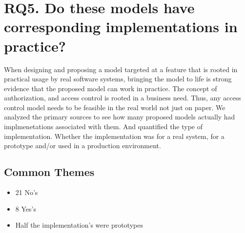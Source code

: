 \documentclass[letterpaper,10pt,english]{sphinxmanual}
\begin{document}
\chapter{RQ5. Do these models have corresponding implementations in practice?}
\label{research_questions/RQ_5::doc}\label{research_questions/RQ_5:rq5-do-these-models-have-corresponding-implementations-in-practice}
When designing and proposing a model targeted at a feature that is rooted in practical
usage by real software systems, bringing the model to life is strong evidence that the
proposed model can work in practice.  The concept of authorization, and access control
is rooted in a business need.  Thus, any access control model needs to be feasible
in the real world not just on paper.  We analyzed the primary sources to see how many
proposed models actually had implmenetations associated with them.  And quantified the
type of implementation.  Whether the implementation was for a real system, for a prototype
and/or used in a production environment.


\section{Common Themes}
\label{research_questions/RQ_5:common-themes}\begin{itemize}
\item {} 
21 No's

\item {} 
8 Yes's

\item {} 
Half the implementation's were prototypes

\end{itemize}
\end{document}
